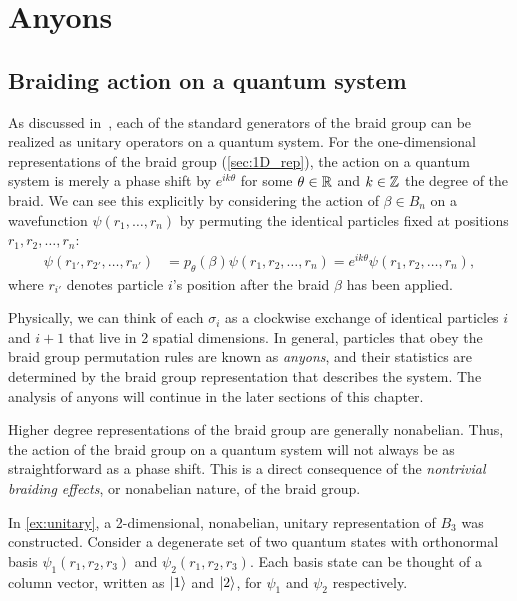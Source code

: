 \chapter{Anyons}\label{ch:anyons}

\section{Braiding action on a quantum system}
As discussed in~\cite{Deshmukh}, each of the standard generators of the braid group can be realized as unitary operators on a quantum system. For the one-dimensional representations of the braid group (\cref{sec:1D_rep}), the action on a quantum system is merely a phase shift by $e^{ik\theta}$ for some $\theta\in\mathbb{R}$ and $k\in\mathbb{Z}$ the degree of the braid. We can see this explicitly by considering the action of $\beta\in B_n$ on a wavefunction $\psi(r_1,\dots,r_n)$ by permuting the identical particles fixed at positions $r_1,r_2,\dots,r_n$:
\begin{align*}
    \psi(r_{1'},r_{2'},\dots,r_{n'}) &= p_\theta(\beta)\psi(r_1,r_2,\dots,r_n) = e^{ik\theta}\psi(r_1,r_2,\dots,r_n),
\end{align*}
where $r_{i'}$ denotes particle $i$'s position after the braid $\beta$ has been applied. 

Physically, we can think of each $\sigma_i$ as a clockwise exchange of identical particles $i$ and $i+1$ that live in 2 spatial dimensions. In general, particles that obey the braid group permutation rules are known as \textit{anyons}, and their statistics are determined by the braid group representation that describes the system. The analysis of anyons will continue in the later sections of this chapter.

Higher degree representations of the braid group are generally nonabelian. Thus, the action of the braid group on a quantum system will not always be as straightforward as a phase shift. This is a direct consequence of the \textit{nontrivial braiding effects}, or nonabelian nature, of the braid group.

In \cref{ex:unitary}, a 2-dimensional, nonabelian, unitary representation of $B_3$ was constructed. Consider a degenerate set of two quantum states with orthonormal basis $\psi_1(r_1,r_2,r_3)$ and $\psi_2(r_1,r_2,r_3)$. Each basis state can be thought of a column vector, written as $\ket{1}$ and $\ket{2}$, for $\psi_1$ and $\psi_2$ respectively.


